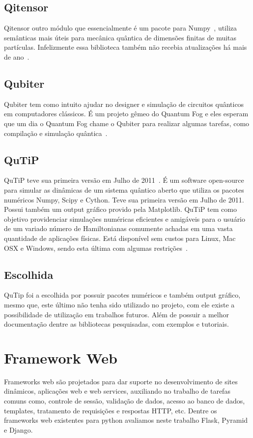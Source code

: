 \documentclass[a4paper, 12pt, oneside]{book}
\begin{document}
\subsection{Qitensor}
Qitensor outro módulo que essencialmente é um pacote para Numpy~\cite{numpy}, utiliza semânticas mais úteis para mecânica quântica de dimensões finitas de muitas partículas. Infelizmente essa biblioteca também não recebia atualizações há mais de ano~\cite{qitensor}.
\subsection{Qubiter}
Qubiter tem como intuito ajudar no designer e simulação de circuitos quânticos em computadores clássicos. É um projeto gêmeo do Quantum Fog e eles esperam que um dia o Quantum Fog chame o Qubiter para realizar algumas tarefas, como compilação e simulação quântica~\cite{qubiter}.	

\subsection{QuTiP}
QuTiP teve sua primeira versão em Julho de 2011~\cite{qutipchangelog}. É um software open-source para simular as dinâmicas de um sistema quântico aberto que utiliza os pacotes numéricos Numpy, Scipy e Cython. Teve sua primeira versão em Julho de 2011. Possui também um output gráfico provido pela Matplotlib. QuTiP tem como objetivo providenciar simulações numéricas eficientes e amigáveis para o usuário de um variado número de Hamiltonianas comumente achadas em uma vasta quantidade de aplicações físicas. Está disponível sem custos para Linux, Mac OSX e Windows, sendo esta última com algumas restrições~\cite{qutip.org}.

\subsection{Escolhida}
QuTip foi a escolhida por possuir pacotes numéricos e também output gráfico, mesmo que, este último não tenha sido utilizado no projeto, com ele existe a possibilidade de utilização em trabalhos futuros. Além de possuir a melhor documentação dentre as bibliotecas pesquisadas, com exemplos e tutoriais.

\section{Framework Web}
Frameworks web são projetados para dar suporte no desenvolvimento de sites dinâmicos, aplicações web e web services, auxiliando no trabalho de tarefas comuns como, controle de sessão, validação de dados, acesso ao banco de dados, templates, tratamento de requisições e respostas HTTP, etc. Dentre os frameworks web existentes para python avaliamos neste trabalho Flask, Pyramid e Django.
\end{document}
